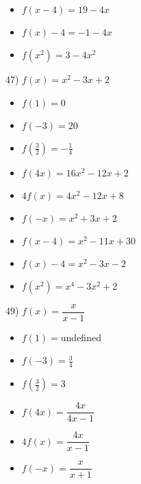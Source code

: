 \documentclass[12pt]{book}
\theoremstyle{definition}
\begin{document}
\begin{multicols}{3}
\begin{itemize}
\item  $f(x-4)=19-4x$
\item $f(x) - 4=-1-4x$
\item  $f\left(x^2\right)=3-4x^2$
\end{itemize}
\end{multicols}

47) $f(x)=x^2-3x+2$
\begin{multicols}{3}
\begin{itemize}
\item $f(1)=0$
\item $f(-3)=20$
\item $f\left(\frac{3}{2} \right)=-\frac{1}{4}$
\end{itemize}
\end{multicols}

\begin{multicols}{3}
\begin{itemize}
\item  $f(4x)=16x^2-12x+2$
\item $4f(x)=4x^2-12x+8$
\item $f(-x)=x^2+3x+2$
\end{itemize}
\end{multicols}

\begin{multicols}{3}
\begin{itemize}
\item  $f(x-4)=x^2-11x+30$
\item $f(x) - 4=x^2-3x-2$
\item  $f\left(x^2\right)=x^4-3x^2+2$
\end{itemize}
\end{multicols}

49) $f(x)=\dfrac{x}{x-1}$
\begin{multicols}{3}
\begin{itemize}
\item $f(1)=$undefined
\item $f(-3)=\frac{3}{4}$
\item $f\left(\frac{3}{2} \right)=3$
\end{itemize}
\end{multicols}

\begin{multicols}{3}
\begin{itemize}
\item  $f(4x)=\dfrac{4x}{4x-1}$
\item $4f(x)=\dfrac{4x}{x-1}$
\item $f(-x)=\dfrac{x}{x+1}$
\end{itemize}
\end{multicols}
\end{document}
